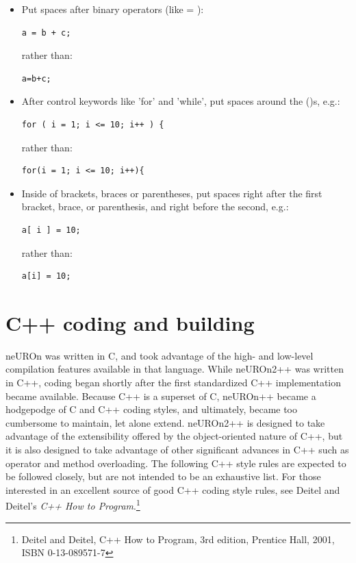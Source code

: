 \documentclass{report}
\begin{document}
\begin{itemize}

\item Put spaces after binary operators (like = ):
\begin{verbatim}
a = b + c;
\end{verbatim}
rather than:
\begin{verbatim}
a=b+c;
\end{verbatim}

\item After control keywords like 'for' and 'while', put spaces around
      the ()s, e.g.:
\begin{verbatim}
for ( i = 1; i <= 10; i++ ) {
\end{verbatim}
rather than:
\begin{verbatim}
for(i = 1; i <= 10; i++){
\end{verbatim}

\item Inside of brackets, braces or parentheses, put spaces right
      after the first bracket, brace, or parenthesis, and right before
      the second, e.g.:
\begin{verbatim}
a[ i ] = 10;
\end{verbatim}
rather than:
\begin{verbatim}
a[i] = 10;
\end{verbatim}

\end{itemize}

\chapter{C++ coding and building}

neUROn was written in C, and took advantage of the high- and low-level
compilation features available in that language.  While neUROn2++ was
written in C++, coding began shortly after the first standardized C++
implementation became available.  Because C++ is a superset of C,
neUROn++ became a hodgepodge of C and C++ coding styles, and
ultimately, became too cumbersome to maintain, let alone extend.
neUROn2++ is designed to take advantage of the extensibility offered
by the object-oriented nature of C++, but it is also designed to take
advantage of other significant advances in C++ such as operator and
method overloading.  The following C++ style rules are expected to be
followed closely, but are not intended to be an exhaustive list.  For
those interested in an excellent source of good C++ coding style
rules, see Deitel and Deitel's {\em C++ How to
Program}.\footnote{Deitel and Deitel, C++ How to Program, 3rd edition,
Prentice Hall, 2001, ISBN 0-13-089571-7}
\end{document}

